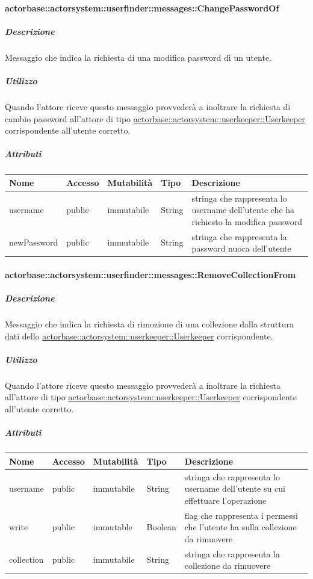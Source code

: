 \documentclass{scalatekids-article}
\begin{document}
\paragraph{actorbase::actorsystem::userfinder::messages::ChangePasswordOf}
\label{sec:actorbase::actorsystem::userfinder::messages::ChangePasswordOf}

\subparagraph{Descrizione}
Messaggio che indica la richiesta di una modifica password di un utente.

\subparagraph{Utilizzo}
Quando l'attore riceve questo messaggio provvederà a inoltrare la richiesta di cambio password all'attore di tipo \hyperref[sec:actorbase::actorsystem::userkeeper::Userkeeper]{actorbase::\allowbreak{}actorsystem::\allowbreak{}userkeeper::\allowbreak{}Userkeeper}
corrispondente all'utente corretto.

\subparagraph{Attributi}
\begin{tabular}{| p{3cm} | p{1.5cm} | p{2cm} | p{2cm} | p{8.5cm} |}
  \hline
  Nome & Accesso & Mutabilità & Tipo & Descrizione\\
  \hline
  username & public & immutabile & String & stringa che rappresenta lo username dell'utente che ha richiesto la modifica password \\
  \hline
  newPassword & public & immutabile & String & stringa che rappresenta la password nuoca dell'utente \\
  \hline
\end{tabular}

\paragraph{actorbase::actorsystem::userfinder::messages::RemoveCollectionFrom}
\label{sec:actorbase::actorsystem::userfinder::messages::RemoveCollectionFrom}

\subparagraph{Descrizione}
Messaggio che indica la richiesta di rimozione di una collezione dalla struttura dati dello \hyperref[sec:actorbase::actorsystem::userkeeper::Userkeeper]{actorbase::\allowbreak{}actorsystem::\allowbreak{}userkeeper::\allowbreak{}Userkeeper} corrispondente.

\subparagraph{Utilizzo}
Quando l'attore riceve questo messaggio provvederà a inoltrare la richiesta
all'attore di tipo \hyperref[sec:actorbase::actorsystem::userkeeper::Userkeeper]{actorbase::\allowbreak{}actorsystem::\allowbreak{}userkeeper::\allowbreak{}Userkeeper}
corrispondente all'utente corretto.

\subparagraph{Attributi}
\begin{tabular}{| p{3cm} | p{1.5cm} | p{2cm} | p{2cm} | p{8.5cm} |}
  \hline
  Nome & Accesso & Mutabilità & Tipo & Descrizione\\
  \hline
  username & public & immutabile & String & stringa che rappresenta lo username dell'utente su cui effettuare l'operazione \\
  \hline
  write & public & immutable & Boolean & flag che rappresenta i permessi che l'utente ha sulla collezione da rimuovere \\
  \hline
  collection & public & immutabile & String & stringa che rappresenta la collezione da rimuovere \\
  \hline
\end{tabular}
\end{document}
